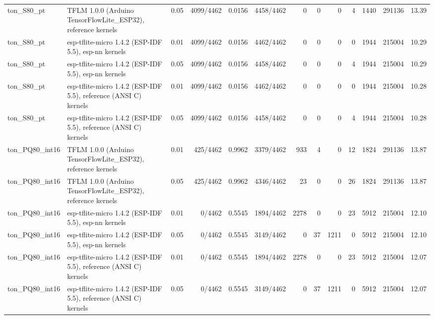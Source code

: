 \documentclass[10pt]{article}
\begin{document}
{\begin{longtable}{llrrrrrrrrrrr}
ton\_S80\_pt & TFLM 1.0.0 (Arduino TensorFlowLite\_ESP32), reference kernels & 0.05 & 4099/4462 & 0.0156 & 4458/4462 & 0 & 0 & 0 & 4 & 1440 & 291136 & 13.39 \\
ton\_S80\_pt & esp-tflite-micro 1.4.2 (ESP-IDF 5.5), esp-nn kernels & 0.01 & 4099/4462 & 0.0156 & 4462/4462 & 0 & 0 & 0 & 0 & 1944 & 215004 & 10.29 \\
ton\_S80\_pt & esp-tflite-micro 1.4.2 (ESP-IDF 5.5), esp-nn kernels & 0.05 & 4099/4462 & 0.0156 & 4458/4462 & 0 & 0 & 0 & 4 & 1944 & 215004 & 10.29 \\
ton\_S80\_pt & esp-tflite-micro 1.4.2 (ESP-IDF 5.5), reference (ANSI C) kernels & 0.01 & 4099/4462 & 0.0156 & 4462/4462 & 0 & 0 & 0 & 0 & 1944 & 215004 & 10.28 \\
ton\_S80\_pt & esp-tflite-micro 1.4.2 (ESP-IDF 5.5), reference (ANSI C) kernels & 0.05 & 4099/4462 & 0.0156 & 4458/4462 & 0 & 0 & 0 & 4 & 1944 & 215004 & 10.28 \\
ton\_PQ80\_int16 & TFLM 1.0.0 (Arduino TensorFlowLite\_ESP32), reference kernels & 0.01 & 425/4462 & 0.9962 & 3379/4462 & 933 & 4 & 0 & 12 & 1824 & 291136 & 13.87 \\
ton\_PQ80\_int16 & TFLM 1.0.0 (Arduino TensorFlowLite\_ESP32), reference kernels & 0.05 & 425/4462 & 0.9962 & 4346/4462 & 23 & 0 & 0 & 26 & 1824 & 291136 & 13.87 \\
ton\_PQ80\_int16 & esp-tflite-micro 1.4.2 (ESP-IDF 5.5), esp-nn kernels & 0.01 & 0/4462 & 0.5545 & 1894/4462 & 2278 & 0 & 0 & 23 & 5912 & 215004 & 12.10 \\
ton\_PQ80\_int16 & esp-tflite-micro 1.4.2 (ESP-IDF 5.5), esp-nn kernels & 0.05 & 0/4462 & 0.5545 & 3149/4462 & 0 & 37 & 1211 & 0 & 5912 & 215004 & 12.10 \\
ton\_PQ80\_int16 & esp-tflite-micro 1.4.2 (ESP-IDF 5.5), reference (ANSI C) kernels & 0.01 & 0/4462 & 0.5545 & 1894/4462 & 2278 & 0 & 0 & 23 & 5912 & 215004 & 12.07 \\
ton\_PQ80\_int16 & esp-tflite-micro 1.4.2 (ESP-IDF 5.5), reference (ANSI C) kernels & 0.05 & 0/4462 & 0.5545 & 3149/4462 & 0 & 37 & 1211 & 0 & 5912 & 215004 & 12.07 \\
\end{longtable}}
\end{document}
